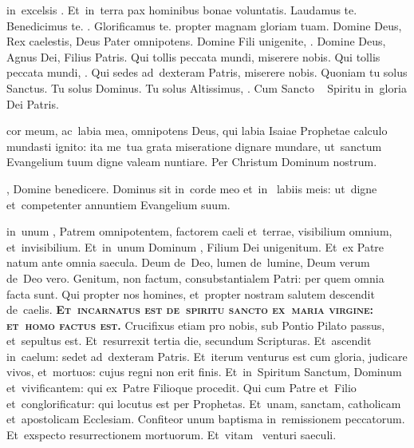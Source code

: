\documentclass[first]{../altarcard}
\begin{document}
\begin{center}

	\begin{minipage}[t]{0.29\linewidth}

		\topgap

		 in~excelsis . Et~in~terra pax hominibus
		bonae voluntatis. Laudamus te. Benedicimus te. .
		Glorificamus te.  propter magnam gloriam tuam.
		Domine Deus, Rex caelestis, Deus Pater omnipotens. Domine Fili
		unigenite, . Domine Deus, Agnus Dei, Filius Patris.
		Qui tollis peccata mundi, miserere nobis. Qui tollis peccata mundi,
		. Qui sedes ad~dexteram Patris,
		miserere nobis. Quoniam tu solus Sanctus. Tu solus Dominus. Tu solus
		Altissimus, . Cum Sancto \cross~ Spiritu in~gloria
		Dei Patris. \amen

		\gap

		 cor meum, ac~labia mea, omnipotens Deus, qui labia
		Isaiae Prophetae calculo mundasti ignito: ita me~tua grata miseratione
		dignare mundare, ut~sanctum Evangelium tuum digne valeam nuntiare. Per
		Christum Dominum nostrum. \amen

		\gap

		, Domine benedicere. Dominus sit in~corde meo et~in~
		labiis meis: ut~digne et~competenter annuntiem Evangelium suum. \amen

		\gap

		 in~unum , Patrem omnipotentem, factorem
		caeli et~terrae, visibilium omnium, et~invisibilium. Et~in~unum Dominum
		, Filium Dei unigenitum. Et~ex Patre natum ante
		omnia saecula. Deum de~Deo, lumen de~lumine, Deum verum de~Deo vero.
		Genitum, non factum, consubstantialem Patri: per quem omnia facta sunt.
		Qui propter nos homines, et~propter nostram salutem descendit de~caelis.
		\textcolor{newred}{\bfseries\scshape Et~incarnatus est de~spiritu sancto
			ex~maria virgine: et~homo factus est.} Crucifixus etiam pro nobis, sub
		Pontio Pilato passus, et~sepultus est. Et~resurrexit tertia die,
		secundum Scripturas. Et~ascendit in~caelum: sedet ad~dexteram Patris.
		Et~iterum venturus est cum gloria, judicare vivos, et~mortuos: cujus
		regni non erit finis. Et~in~Spiritum Sanctum, Dominum et~vivificantem:
		qui ex~Patre Filioque procedit. Qui cum Patre et~Filio  et~conglorificatur: qui locutus est per Prophetas. Et~unam,
		sanctam, catholicam et~apostolicam Ecclesiam. Confiteor unum baptisma
		in~remissionem peccatorum. Et~exspecto resurrectionem mortuorum.
		Et~vitam \cross~venturi saeculi. \amen


\end{minipage}
\end{center}
\end{document}
